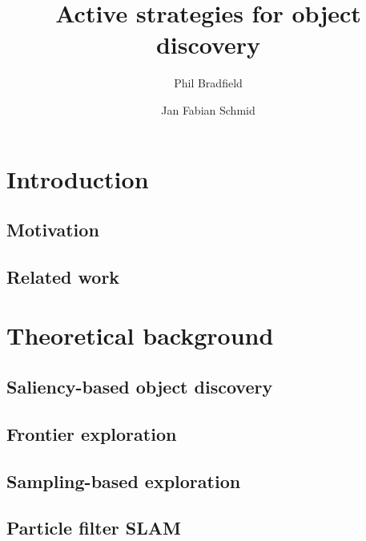 \documentclass[a4paper,11pt,english]{article}
\begin{document}
\title{Active strategies for object discovery}
\author{Phil Bradfield \and Jan Fabian Schmid}
	
\maketitle 

\section{Introduction}

\subsection{Motivation}
\subsection{Related work}

\section{Theoretical background}

\subsection{Saliency-based object discovery}
\subsection{Frontier exploration}
\subsection{Sampling-based exploration}
\subsection{Particle filter SLAM}
\end{document}
